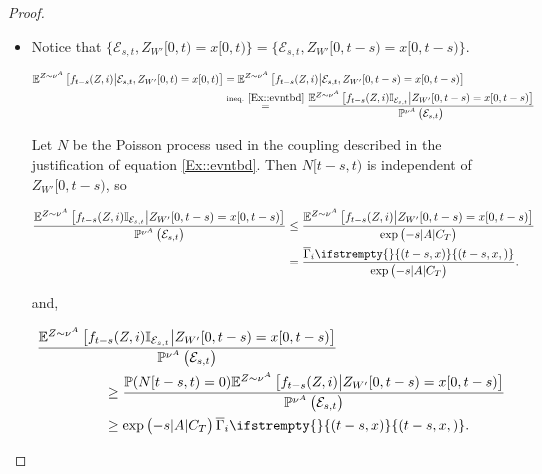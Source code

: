 \documentclass[12pt]{article}
\newcommand{\mb}{\mathbb}
\newcommand{\mc}{\mathcal}
\newcommand{\ov}{\overline}
\newcommand{\os}{\overset}
\newcommand{\te}{\text}
\newcommand{\pr}{\mb{P}}							%
\newcommand{\exmu}[2]{\mb{E}^{#1}\left[#2\right]}	%
\newcommand{\poiss}{N}								%
\newcommand{\xf}{x}									%
\newcommand{\vind}[1]{_{#1}}						%
\newcommand{\tmi}[1]{#1}							%
\newcommand{\vpara}[1]{^{#1}}						%
\newcommand{\stpara}[1]{_{#1}}						%
\newcommand{\tpara}[1]{_{#1}}						%
\newcommand{\jumpbd}[1]{C_{#1}}						%
\newcommand{\tmepro}[3]{
\ifstrempty{#3}{
	\left(#1,#2\right)}{
	\left(#1,#2,#3\right)}}							%
\newcommand{\evnt}{\mc{E}}						%
\newcommand{\ratee}{\Gamma}							%
\newcommand{\grate}{\ov{\ratee}}					%
\newcommand{\mm}{\nu}								%
\newcommand{\mpara}[1]{^{#1}}						%
\newcommand{\tspara}[2]{_{#1,#2}}					%
\newcommand{\Xh}{Z}									%
\begin{document}
\begin{proof}
\begin{itemize}
\item Notice that \(\{\evnt\tspara{s}{t},\Xh\vind{W'}\tmi{[0,t)} = \xf\tmi{[0,t)}\} = \{\evnt\tspara{s}{t},\Xh\vind{W'}\tmi{[0,t-s)} = \xf\tmi{[0,t-s)}\}\).

\begin{align*}
\exmu{\Xh \sim\mm\vpara{A}}{f\tpara{t-s}(\Xh,i)\middle|\evnt\tspara{s}{t},\Xh\vind{W'}\tmi{[0,t)} = \xf\tmi{[0,t)}} &= \exmu{\Xh \sim\mm\vpara{A}}{f\tpara{t-s}(\Xh,i)\middle|\evnt\tspara{s}{t},\Xh\vind{W'}\tmi{[0,t-s)} = \xf\tmi{[0,t-s)}}\\
&\os{\te{ineq. }\eqref{Ex::evntbd}}{=}\frac{\exmu{\Xh \sim\mm\vpara{A}}{f\tpara{t-s}(\Xh,i)\mb{I}_{\evnt\tspara{s}{t}}\middle|\Xh\vind{W'}\tmi{[0,t-s)} = \xf\tmi{[0,t-s)}}}{\pr\mpara{\mm\vpara{A}}\left(\evnt\tspara{s}{t}\right)}
\end{align*}

Let \(\poiss\) be the Poisson process used in the coupling described in the justification of equation \eqref{Ex::evntbd}. Then \(\poiss\tmi{[t-s,t)}\) is independent of \(\Xh\vind{W'}\tmi{[0,t-s)}\), so

\begin{align*}
\frac{\exmu{\Xh \sim\mm\vpara{A}}{f\tpara{t-s}(\Xh,i)\mb{I}_{\evnt\tspara{s}{t}}\middle|\Xh\vind{W'}\tmi{[0,t-s)} = \xf\tmi{[0,t-s)}}}{\pr\mpara{\mm\vpara{A}}\left(\evnt\tspara{s}{t}\right)} &\leq \frac{\exmu{\Xh\sim\mm\vpara{A}}{f\tpara{t-s}(\Xh,i)\middle|\Xh\vind{W'}\tmi{[0,t-s)} = \xf\tmi{[0,t-s)}}}{\exp\left(-s|A|\jumpbd{T}\right)}\\
&= \frac{\grate\stpara{i}\tmepro{t-s}{\xf}{}}{\exp\left(-s|A|\jumpbd{T}\right)}.
\end{align*}

and,

\begin{align*}
&\frac{\exmu{\Xh \sim\mm\vpara{A}}{f\tpara{t-s}(\Xh,i)\mb{I}_{\evnt\tspara{s}{t}}\middle|\Xh\vind{W'}\tmi{[0,t-s)} = \xf\tmi{[0,t-s)}}}{\pr\mpara{\mm\vpara{A}}\left(\evnt\tspara{s}{t}\right)} \\
&\hspace{48 pt}\geq \frac{\pr(\poiss\tmi{[t-s,t)} = 0)\exmu{\Xh \sim\mm\vpara{A}}{f\tpara{t-s}(\Xh,i)\middle|\Xh\vind{W'}\tmi{[0,t-s)} = \xf\tmi{[0,t-s)}}}{\pr\mpara{\mm\vpara{A}}\left(\evnt\tspara{s}{t}\right)}\\
&\hspace{48 pt} \geq \exp\left(-s|A|\jumpbd{T}\right)\grate\stpara{i}\tmepro{t-s}{\xf}{}.
\end{align*}


\end{itemize}
\end{proof}
\end{document}

